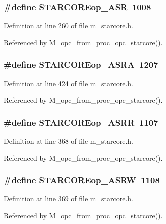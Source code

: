 \subsubsection{\setlength{\rightskip}{0pt plus 5cm}\#define STARCOREop\_\-ASR~1008}\label{m__starcore_8h_25bb7d578866cd7231bded31ec8eed3a}




Definition at line 260 of file m\_\-starcore.h.

Referenced by M\_\-opc\_\-from\_\-proc\_\-opc\_\-starcore().
\subsubsection{\setlength{\rightskip}{0pt plus 5cm}\#define STARCOREop\_\-ASRA~1207}\label{m__starcore_8h_e95f9dce3498e7836f1aab86a2da1bdd}




Definition at line 424 of file m\_\-starcore.h.

Referenced by M\_\-opc\_\-from\_\-proc\_\-opc\_\-starcore().
\subsubsection{\setlength{\rightskip}{0pt plus 5cm}\#define STARCOREop\_\-ASRR~1107}\label{m__starcore_8h_157b7b4ffe0d6fc985d2f41e53c2e83c}




Definition at line 368 of file m\_\-starcore.h.

Referenced by M\_\-opc\_\-from\_\-proc\_\-opc\_\-starcore().
\subsubsection{\setlength{\rightskip}{0pt plus 5cm}\#define STARCOREop\_\-ASRW~1108}\label{m__starcore_8h_1add07517de784a12f07f2b41212abf1}




Definition at line 369 of file m\_\-starcore.h.

Referenced by M\_\-opc\_\-from\_\-proc\_\-opc\_\-starcore().
